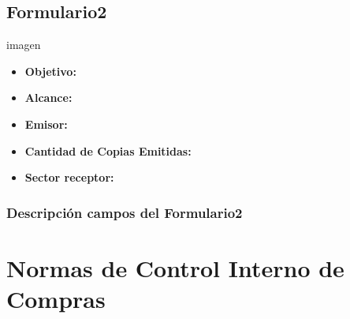 \subsection{Formulario2}
imagen
\begin{itemize}
  \item \textbf{Objetivo:}
  \item \textbf{Alcance:}
  \item \textbf{Emisor:}
  \item \textbf{Cantidad de Copias Emitidas:}
  \item \textbf{Sector receptor:}
 \end{itemize}
\subsubsection{Descripci\'on campos del Formulario2}

\pagebreak
\section{Normas de Control Interno de Compras}

